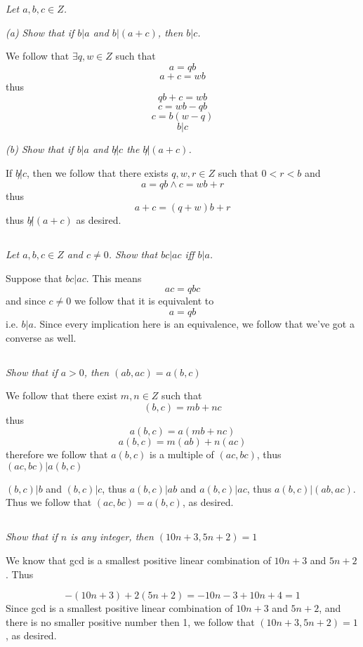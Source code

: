 \documentclass[11pt,oneside,titlepage]{book}
\begin{document}
\textit{Let $a, b, c \in Z$.}

\textit{(a) Show that if $b|a$ and $b|(a + c)$, then $b|c$.}

We follow that $\exists q, w \in Z$ such that 
$$a = qb $$
$$a + c = wb$$
thus 
$$qb + c = wb$$
$$c = wb - qb$$
$$c = b(w - q)$$
$$b | c$$

\textit{(b) Show that if $b|a$ and $b\not|c$ the $b \not | (a + c)$.}

If $b \not | c$, then we follow that there exists $q, w, r \in Z$ such that $0 < r < b$ and 
$$a = qb \land c = wb + r$$
thus
$$a + c = (q + w)b + r$$
thus $b \not | (a + c)$ as desired.

\subsection{}

\textit{Let $a, b, c \in Z$ and $c \neq 0$. Show that $bc | ac$ iff $b | a$.}

Suppose that $bc | ac$. This means 
$$ac = qbc$$
and since $c \neq 0$ we follow that it is equivalent to 
$$a = qb$$
i.e. $b|a$. Since every implication here is an equivalence, we follow that we've got a
converse as well.

\subsection{}

\textit{Show that if $a > 0$, then $(ab, ac) = a(b, c)$}

We follow that there exist $m, n \in Z$ such that 
$$(b, c) = mb + nc$$
thus
$$a(b, c) = a(mb + nc)$$
$$a(b, c) = m(ab) + n(ac)$$
therefore we follow that $a(b, c)$ is a multiple of $(ac, bc)$, thus $(ac, bc)|a(b, c)$

$(b, c)| b$ and $(b, c)| c$, thus $a(b, c) | ab$ and $a(b, c) | ac$, thus $a(b, c) | (ab, ac)$.
Thus we follow that $(ac, bc) = a(b, c)$, as desired.

\subsection{}

\textit{Show that if $n$ is any integer, then $(10n + 3, 5n + 2)  = 1$}

We know that gcd is a smallest positive linear combination of $10 n + 3$ and $5n + 2$. Thus

$$-(10 n + 3) + 2(5n + 2) = -10n - 3 + 10n + 4 = 1$$
Since gcd is a smallest positive linear combination of $10n + 3$ and $5n + 2$, and there
is no smaller positive number then 1, we follow that $(10n + 3, 5n + 2) = 1$, as desired.
\end{document}
